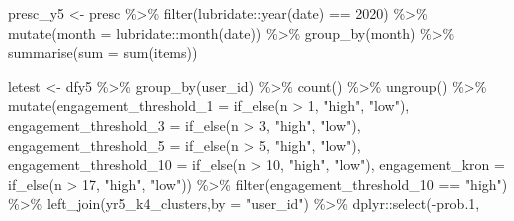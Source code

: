 \documentclass[
]{article}
\newenvironment{Shaded}{\begin{snugshade}}{\end{snugshade}}
\newcommand{\AttributeTok}[1]{\textcolor[rgb]{0.77,0.63,0.00}{#1}}
\newcommand{\DecValTok}[1]{\textcolor[rgb]{0.00,0.00,0.81}{#1}}
\newcommand{\FloatTok}[1]{\textcolor[rgb]{0.00,0.00,0.81}{#1}}
\newcommand{\FunctionTok}[1]{\textcolor[rgb]{0.00,0.00,0.00}{#1}}
\newcommand{\NormalTok}[1]{#1}
\newcommand{\OtherTok}[1]{\textcolor[rgb]{0.56,0.35,0.01}{#1}}
\newcommand{\SpecialCharTok}[1]{\textcolor[rgb]{0.00,0.00,0.00}{#1}}
\newcommand{\StringTok}[1]{\textcolor[rgb]{0.31,0.60,0.02}{#1}}
\begin{document}
\begin{Shaded}
\begin{Highlighting}[]
\NormalTok{ presc\_y5 }\OtherTok{\textless{}{-}}\NormalTok{ presc }\SpecialCharTok{\%\textgreater{}\%} 
   \FunctionTok{filter}\NormalTok{(lubridate}\SpecialCharTok{::}\FunctionTok{year}\NormalTok{(date) }\SpecialCharTok{==} \DecValTok{2020}\NormalTok{) }\SpecialCharTok{\%\textgreater{}\%}
   \FunctionTok{mutate}\NormalTok{(}\AttributeTok{month =}\NormalTok{ lubridate}\SpecialCharTok{::}\FunctionTok{month}\NormalTok{(date)) }\SpecialCharTok{\%\textgreater{}\%} 
   \FunctionTok{group\_by}\NormalTok{(month) }\SpecialCharTok{\%\textgreater{}\%} 
   \FunctionTok{summarise}\NormalTok{(}\AttributeTok{sum =} \FunctionTok{sum}\NormalTok{(items))}


\NormalTok{ letest }\OtherTok{\textless{}{-}}\NormalTok{  dfy5 }\SpecialCharTok{\%\textgreater{}\%}
   \FunctionTok{group\_by}\NormalTok{(user\_id) }\SpecialCharTok{\%\textgreater{}\%}
   \FunctionTok{count}\NormalTok{() }\SpecialCharTok{\%\textgreater{}\%}
   \FunctionTok{ungroup}\NormalTok{() }\SpecialCharTok{\%\textgreater{}\%} 
   \FunctionTok{mutate}\NormalTok{(}\AttributeTok{engagement\_threshold\_1 =} \FunctionTok{if\_else}\NormalTok{(n }\SpecialCharTok{\textgreater{}} \DecValTok{1}\NormalTok{, }\StringTok{"high"}\NormalTok{, }\StringTok{"low"}\NormalTok{),}
          \AttributeTok{engagement\_threshold\_3 =} \FunctionTok{if\_else}\NormalTok{(n }\SpecialCharTok{\textgreater{}} \DecValTok{3}\NormalTok{, }\StringTok{"high"}\NormalTok{, }\StringTok{"low"}\NormalTok{),}
          \AttributeTok{engagement\_threshold\_5 =} \FunctionTok{if\_else}\NormalTok{(n }\SpecialCharTok{\textgreater{}} \DecValTok{5}\NormalTok{, }\StringTok{"high"}\NormalTok{, }\StringTok{"low"}\NormalTok{),}
          \AttributeTok{engagement\_threshold\_10 =} \FunctionTok{if\_else}\NormalTok{(n }\SpecialCharTok{\textgreater{}} \DecValTok{10}\NormalTok{, }\StringTok{"high"}\NormalTok{, }\StringTok{"low"}\NormalTok{),}
          \AttributeTok{engagement\_kron =} \FunctionTok{if\_else}\NormalTok{(n }\SpecialCharTok{\textgreater{}} \DecValTok{17}\NormalTok{, }\StringTok{"high"}\NormalTok{, }\StringTok{"low"}\NormalTok{)) }\SpecialCharTok{\%\textgreater{}\%} 
   \FunctionTok{filter}\NormalTok{(engagement\_threshold\_10 }\SpecialCharTok{==} \StringTok{"high"}\NormalTok{) }\SpecialCharTok{\%\textgreater{}\%} 
   \FunctionTok{left\_join}\NormalTok{(yr5\_k4\_clusters,}\AttributeTok{by =} \StringTok{"user\_id"}\NormalTok{) }\SpecialCharTok{\%\textgreater{}\%} 
\NormalTok{   dplyr}\SpecialCharTok{::}\FunctionTok{select}\NormalTok{(}\SpecialCharTok{{-}}\NormalTok{prob}\FloatTok{.1}\NormalTok{,}

\end{Highlighting}
\end{Shaded}
\end{document}

